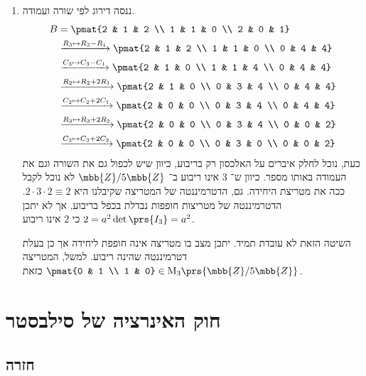 \documentclass[a4paper,10pt,twoside,openany]{book}
\renewcommand{\Mat}{\mathrm{M}}
\begin{document}
\begin{solution}
\begin{enumerate}
\item ננסה דירוג לפי שורה ועמודה.
\begin{align*}
    B &= \pmat{2 & 1 & 2 \\ 1 & 1 & 0 \\ 2 & 0 & 1}
    \\&\xrightarrow{R_3 \mapsto R_3 - R_1}
    \pmat{2 & 1 & 2 \\ 1 & 1 & 0 \\ 0 & 4 & 4}
    \\&\xrightarrow{C_3 \mapsto C_3 - C_1}
    \pmat{2 & 1 & 0 \\ 1 & 1 & 4 \\ 0 & 4 & 4}
    \\&\xrightarrow{R_2 \mapsto R_2 + 2 R_1}
    \pmat{2 & 1 & 0 \\ 0 & 3 & 4 \\ 0 & 4 & 4}
    \\&\xrightarrow{C_2 \mapsto C_2 + 2 C_1}
    \pmat{2 & 0 & 0 \\ 0 & 3 & 4 \\ 0 & 4 & 4}
    \\&\xrightarrow{R_3 \mapsto R_3 + 2 R_2}
    \pmat{2 & 0 & 0 \\ 0 & 3 & 4 \\ 0 & 0 & 2}
    \\&\xrightarrow{C_3 \mapsto C_3 + 2 C_2}
    \pmat{2 & 0 & 0 \\ 0 & 3 & 0 \\ 0 & 0 & 2}
\end{align*}
כעת, נוכל לחלק איברים על האלכסון רק בריבוע, כיוון שיש לכפול גם את השורה וגם את העמודה באותו מספר. כיוון ש־%
$3$
אינו ריבוע ב־%
$\mbb{Z}/5\mbb{Z}$
לא נוכל לקבל ככה את מטריצת היחידה.
גם, הדטרמיננטה של המטריצה שקיבלנו היא
$2 \cdot 3 \cdot 2 \equiv 2$.
הדטרמיננטה של מטריצות חופפות נבדלת בכפל בריבוע, אך לא יתכן
$2 = a^2 \det\prs{I_3} = a^2$
כי
$2$
אינו ריבוע.

השיטה הזאת לא עובדת תמיד. יתכן מצב בו מטריצה אינה חופפת ליחידה אך כן בעלת דטרמיננטה שהינה ריבוע.
למשל, המטריצה
$\pmat{0 & 1 \\ 1 & 0} \in \Mat_3\prs{\mbb{Z}/5\mbb{Z}}$
כזאת.
\end{enumerate}
\end{solution}

\section{חוק האינרציה של סילבסטר}

\subsection{חזרה}
\end{document}
